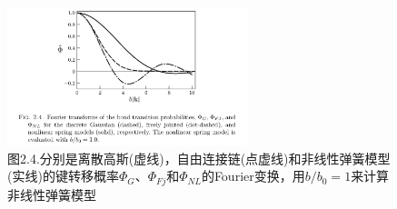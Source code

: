 \begin{figure}[ht]
\centering
\includegraphics[width=7cm]{./figures/24.png}
\caption{图2.4.分别是离散高斯(虚线)，自由连接链(点虚线)和非线性弹簧模型(实线)的键转移概率$\varPhi_{G}$、$\varPhi_{Fj}$和$\varPhi_{NL}$的Fourier变换，用$b/b_{0}=1$来计算非线性弹簧模型}
\end{figure}

